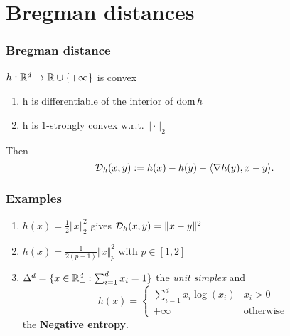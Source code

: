\documentclass{beamer}
\begin{document}
\section{Bregman distances}%

\begin{frame}
  \frametitle{Bregman distance}
  $h: \mathbb{R}^d \to \mathbb{R} \cup \{+\infty\}$ is convex
  \begin{enumerate}
    \item h is differentiable of the interior of $\operatorname*{dom} h$
    \item h is $1$-strongly convex w.r.t. $\Vert \cdot \Vert_2$
  \end{enumerate}
  Then
  \begin{equation}
    \mathcal{D}_h(x,y) := h(x) - h(y) - \langle \nabla h(y), x-y \rangle.
  \end{equation}

\end{frame}

\begin{frame}
  \frametitle{Examples} %
  \begin{enumerate}
    \item $h(x) = \frac12 \Vert x \Vert_2^2$ gives $\mathcal{D}_h(x,y) = \Vert x-y \Vert^2$
    \item $h(x) = \frac{1}{2(p-1)} \Vert x \Vert_p^2$ with $p \in [1, 2]$
    \item  $\Delta^d= \{x \in \mathbb{R}^d_+ : \sum_{i=1}^{d}x_i = 1\}$ the \emph{unit simplex} and
          \begin{equation}
            h(x) =
            \begin{cases}
              \sum_{i=1}^{d} x_i \log(x_i) & x_i > 0 \\
              +\infty & \text{otherwise}
            \end{cases}
          \end{equation}
          the \textbf{Negative entropy}.\\
  \end{enumerate}
\end{frame}
\end{document}
